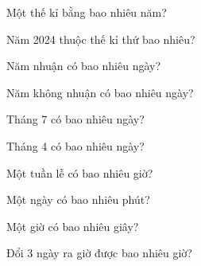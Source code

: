 
\begin{ex}
  Một thế kỉ bằng bao nhiêu năm?
\end{ex}

\begin{ex}
  Năm 2024 thuộc thế kỉ thứ bao nhiêu?
\end{ex}

\begin{ex}
  Năm nhuận có bao nhiêu ngày?
\end{ex}

\begin{ex}
  Năm không nhuận có bao nhiêu ngày?
\end{ex}

\begin{ex}
  Tháng 7 có bao nhiêu ngày?
\end{ex}

\begin{ex}
  Tháng 4 có bao nhiêu ngày?
\end{ex}

\begin{ex}
  Một tuần lễ có bao nhiêu giờ?
\end{ex}

\begin{ex}
  Một ngày có bao nhiêu phút?
\end{ex}

\begin{ex}
  Một giờ có bao nhiêu giây?
\end{ex}

\begin{ex}
  Đổi $3$ ngày ra giờ được bao nhiêu giờ?
\end{ex}

